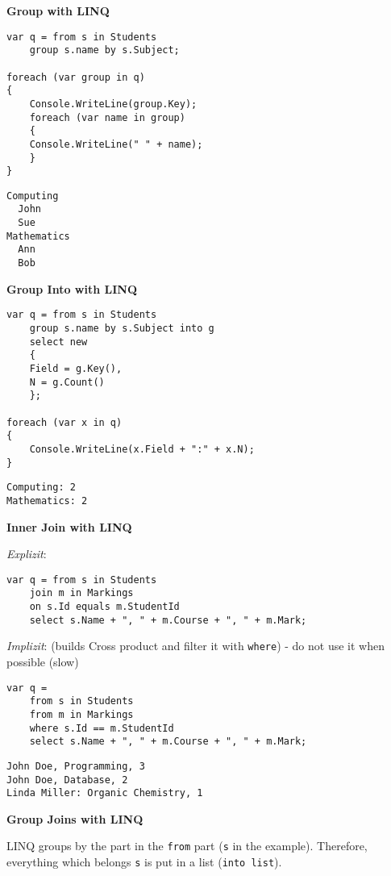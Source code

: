 \documentclass[11pt,twoside,landscape]{article}
\begin{document}
\begin{multicols}{3}
\textbf{Group with LINQ}

\lstset{language=csharp,label= ,caption= ,captionpos=b,numbers=none}
\begin{lstlisting}
var q = from s in Students
    group s.name by s.Subject;

foreach (var group in q)
{
    Console.WriteLine(group.Key);
    foreach (var name in group)
    {
	Console.WriteLine(" " + name);
    }
}
\end{lstlisting}

\begin{verbatim}
Computing
  John
  Sue
Mathematics
  Ann
  Bob
\end{verbatim}

\textbf{Group Into with LINQ}

\lstset{language=csharp,label= ,caption= ,captionpos=b,numbers=none}
\begin{lstlisting}
var q = from s in Students
    group s.name by s.Subject into g
    select new
    {
	Field = g.Key(),
	N = g.Count()
    };

foreach (var x in q)
{
    Console.WriteLine(x.Field + ":" + x.N);
}
\end{lstlisting}
\begin{verbatim}
Computing: 2
Mathematics: 2
\end{verbatim}

\textbf{Inner Join with LINQ}

\emph{Explizit}:
\lstset{language=csharp,label= ,caption= ,captionpos=b,numbers=none}
\begin{lstlisting}
var q = from s in Students
    join m in Markings
    on s.Id equals m.StudentId
    select s.Name + ", " + m.Course + ", " + m.Mark;
\end{lstlisting}

\emph{Implizit}: (builds Cross product and filter it with \texttt{where}) - do not use it when possible (slow)
\lstset{language=csharp,label= ,caption= ,captionpos=b,numbers=none}
\begin{lstlisting}
var q =
    from s in Students
    from m in Markings
    where s.Id == m.StudentId
    select s.Name + ", " + m.Course + ", " + m.Mark;
\end{lstlisting}
\begin{verbatim}
John Doe, Programming, 3
John Doe, Database, 2
Linda Miller: Organic Chemistry, 1
\end{verbatim}

\textbf{Group Joins with LINQ}

LINQ groups by the part in the \texttt{from} part (\texttt{s} in the example).
Therefore, everything which belongs \texttt{s} is put in a list (\texttt{into list}).


\end{multicols}
\end{document}
